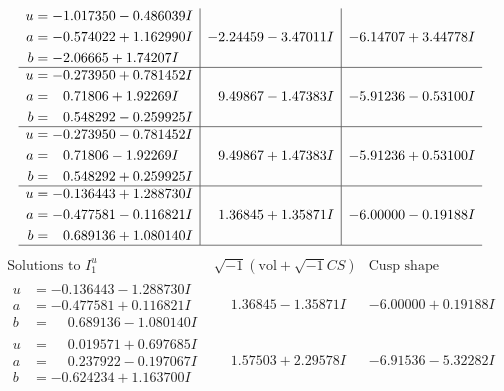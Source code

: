\documentclass[1p]{elsarticle_modified}
\theoremstyle{definition}
\newcommand{\I}{\sqrt{-1}}
\begin{document}
$$\begin{array}{c|c|c}
\begin{aligned}
u &= -1.017350 - 0.486039 I \\
a &= -0.574022 + 1.162990 I \\
b &= -2.06665 + 1.74207 I\end{aligned}
 & -2.24459 - 3.47011 I & -6.14707 + 3.44778 I \\ \hline\begin{aligned}
u &= -0.273950 + 0.781452 I \\
a &= \phantom{-}0.71806 + 1.92269 I \\
b &= \phantom{-}0.548292 - 0.259925 I\end{aligned}
 & \phantom{-}9.49867 - 1.47383 I & -5.91236 - 0.53100 I \\ \hline\begin{aligned}
u &= -0.273950 - 0.781452 I \\
a &= \phantom{-}0.71806 - 1.92269 I \\
b &= \phantom{-}0.548292 + 0.259925 I\end{aligned}
 & \phantom{-}9.49867 + 1.47383 I & -5.91236 + 0.53100 I \\ \hline\begin{aligned}
u &= -0.136443 + 1.288730 I \\
a &= -0.477581 - 0.116821 I \\
b &= \phantom{-}0.689136 + 1.080140 I\end{aligned}
 & \phantom{-}1.36845 + 1.35871 I & -6.00000 - 0.19188 I\\
 \hline 
 \end{array}$$\newpage$$\begin{array}{c|c|c}  
\text{Solutions to }I^u_{1}& \I (\text{vol} + \sqrt{-1}CS) & \text{Cusp shape}\\
 \hline 
\begin{aligned}
u &= -0.136443 - 1.288730 I \\
a &= -0.477581 + 0.116821 I \\
b &= \phantom{-}0.689136 - 1.080140 I\end{aligned}
 & \phantom{-}1.36845 - 1.35871 I & -6.00000 + 0.19188 I \\ \hline\begin{aligned}
u &= \phantom{-}0.019571 + 0.697685 I \\
a &= \phantom{-}0.237922 - 0.197067 I \\
b &= -0.624234 + 1.163700 I\end{aligned}
 & \phantom{-}1.57503 + 2.29578 I & -6.91536 - 5.32282 I \\ \hline\begin{aligned}

\end{aligned}
\end{array}$$
\end{document}
